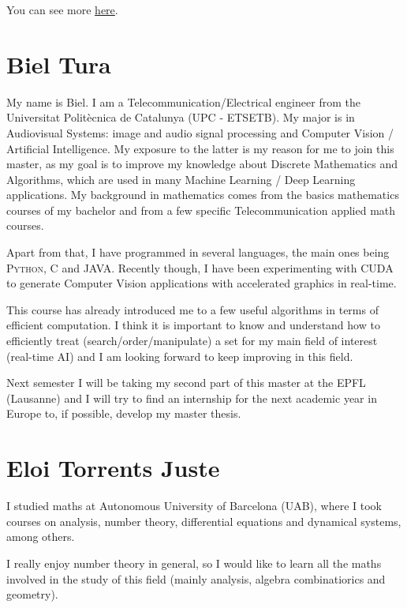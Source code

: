 \documentclass[11pt]{amsart}
\begin{document}
You can see more \href{https://www.linkedin.com/in/victormartinchabrera}{here}.



\medskip

\section*{Biel Tura}
My name is Biel. I am a Telecommunication/Electrical engineer from the Universitat Politècnica de Catalunya (UPC - ETSETB). My major is in Audiovisual Systems: image and audio signal processing and Computer Vision / Artificial Intelligence. My exposure to the latter is my reason for me to join this master, as my goal is to improve my knowledge about Discrete Mathematics and Algorithms, which are used in many Machine Learning / Deep Learning applications. My background in mathematics comes from the basics mathematics courses of my bachelor and from a few specific Telecommunication applied math courses.

Apart from that, I have programmed in several languages, the main ones being \textsc{Python}, \textsc{C} and \textsc{JAVA}. Recently though, I have been experimenting with \textsc{CUDA} to generate Computer Vision applications with accelerated graphics in real-time.

This course has already introduced me to a few useful algorithms in terms of efficient computation. I think it is important to know and understand how to efficiently treat (search/order/manipulate) a set for my main field of interest (real-time AI) and I am looking forward to keep improving in this field.

Next semester I will be taking my second part of this master at the EPFL (Lausanne) and I will try to find an internship for the next academic year in Europe to, if possible, develop my master thesis.


\medskip

\section*{Eloi Torrents Juste}

I studied maths at Autonomous University of Barcelona (UAB), where I took courses on analysis, number theory, differential equations and dynamical systems, among others.

I really enjoy number theory in general, so I would like to learn all the maths involved in the study of this field (mainly analysis, algebra combinatiorics and geometry).
\end{document}
